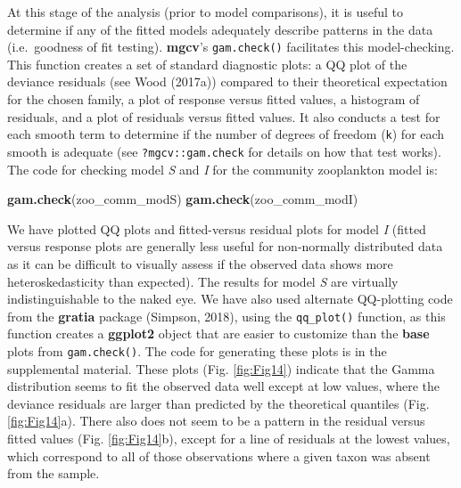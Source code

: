 \documentclass[12pt]{article}
\newenvironment{Shaded}{\begin{snugshade}}{\end{snugshade}}
\newcommand{\KeywordTok}[1]{\textcolor[rgb]{0.13,0.29,0.53}{\textbf{#1}}}
\newcommand{\NormalTok}[1]{#1}
\begin{document}
At this stage of the analysis (prior to model comparisons), it is useful
to determine if any of the fitted models adequately describe patterns in
the data (i.e.~goodness of fit testing). \textbf{mgcv}'s
\texttt{gam.check()} facilitates this model-checking. This function
creates a set of standard diagnostic plots: a QQ plot of the deviance
residuals (see Wood (2017a)) compared to their theoretical expectation
for the chosen family, a plot of response versus fitted values, a
histogram of residuals, and a plot of residuals versus fitted values. It
also conducts a test for each smooth term to determine if the number of
degrees of freedom (\texttt{k}) for each smooth is adequate (see
\texttt{?mgcv::gam.check} for details on how that test works). The code
for checking model \emph{S} and \emph{I} for the community zooplankton
model is:

\begin{Shaded}
\begin{Highlighting}[]
\KeywordTok{gam.check}\NormalTok{(zoo_comm_modS)}
\KeywordTok{gam.check}\NormalTok{(zoo_comm_modI)}
\end{Highlighting}
\end{Shaded}

We have plotted QQ plots and fitted-versus residual plots for model
\emph{I} (fitted versus response plots are generally less useful for
non-normally distributed data as it can be difficult to visually assess
if the observed data shows more heteroskedasticity than expected). The
results for model \emph{S} are virtually indistinguishable to the naked
eye. We have also used alternate QQ-plotting code from the
\textbf{gratia} package (Simpson, 2018), using the \texttt{qq\_plot()}
function, as this function creates a \textbf{ggplot2} object that are
easier to customize than the \textbf{base} plots from
\texttt{gam.check()}. The code for generating these plots is in the
supplemental material. These plots (Fig. \ref{fig:Fig14}) indicate that
the Gamma distribution seems to fit the observed data well except at low
values, where the deviance residuals are larger than predicted by the
theoretical quantiles (Fig. \ref{fig:Fig14}a). There also does not seem
to be a pattern in the residual versus fitted values (Fig.
\ref{fig:Fig14}b), except for a line of residuals at the lowest values,
which correspond to all of those observations where a given taxon was
absent from the sample.
\end{document}
